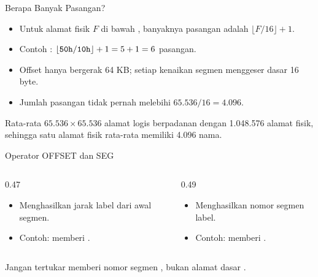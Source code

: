 \documentclass[aspectratio=169,11pt]{beamer}
\begin{document}
\begin{frame}{Berapa Banyak Pasangan?}
\small
\begin{itemize}
    \item Untuk alamat fisik $F$ di bawah , banyaknya
          pasangan adalah $\lfloor F/16 \rfloor + 1$.

    \vspace{0.18em}
    \item Contoh : $\lfloor \texttt{50h}/\texttt{10h}
          \rfloor + 1 = 5 + 1 = 6$ pasangan.

    \vspace{0.18em}
    \item Offset hanya bergerak 64 KB; setiap kenaikan segmen
          menggeser dasar 16 byte.

    \vspace{0.18em}
    \item Jumlah pasangan tidak pernah melebihi
          $65.536/16 = 4.096$.
\end{itemize}

\vspace{0.25em}
\begin{block}{Rata-rata}
\small $65.536 \times 65.536$ alamat logis berpadanan dengan
1.048.576 alamat fisik, sehingga satu alamat fisik rata-rata
memiliki 4.096 nama.
\end{block}
\end{frame}

\begin{frame}{Operator OFFSET dan SEG}
\small
\begin{columns}[t]
\begin{column}{0.47\textwidth}
    {\color{obeTeal}\bfseries {}}\\[0.25em]
    \begin{itemize}
        \item Menghasilkan jarak label dari awal segmen.
        \item Contoh:  memberi
              .
    \end{itemize}
\end{column}
\begin{column}{0.49\textwidth}
    {\color{obeMaroon}\bfseries {}}\\[0.25em]
    \begin{itemize}
        \item Menghasilkan nomor segmen label.
        \item Contoh:  memberi
              .
    \end{itemize}
\end{column}
\end{columns}

\vspace{0.4em}
\begin{alertblock}{Jangan tertukar}
\small {} memberi nomor segmen , bukan alamat
dasar .
\end{alertblock}
\end{frame}
\end{document}
